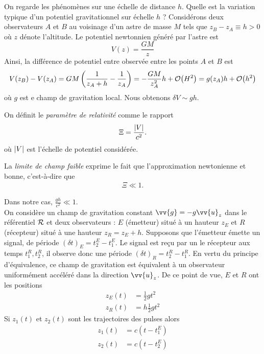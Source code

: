 \documentclass[a4paper,11pt]{report}
\begin{document}
                On regarde les phénomènes sur une échelle de distance $h$. Quelle est la variation typique d'un potentiel gravitationnel sur échelle $h$ ? Considérons deux observateurs $A$ et $B$ au voisinage d'un astre de masse $M$ tels que $z_B-z_A\equiv h>0$ où $z$ dénote l'altitude. Le potentiel newtonnien généré par l'astre est
                \begin{equation}
                    V(z) = \frac{GM}{z}
                \end{equation}
                Ainsi, la différence de potentiel entre observée entre les points $A$ et $B$ est
                \begin{equation}
                    V(z_B)-V(z_A) = GM\left( \frac{1}{z_A+h} -\frac{1}{z_A}\right)=-\frac{GM}{z^2_A}h+\order{H^2} = g(z_A)h +\order{h^2}
                \end{equation}
                où $g$ est e champ de gravitation local. Nous obtenons $\delta V\sim gh$.
                \begin{definition}
                    On définit le \textit{paramètre de relativité} comme le rapport
                    \begin{equation}
                        \Xi = \frac{\abs{V}}{c^2}.
                    \end{equation}
                    où $\abs{V}$ est l'échelle de potentiel considérée.
                \end{definition}
                \begin{definition}
                La \textit{limite de champ faible} exprime le fait que l'approximation newtonienne et bonne, c'est-à-dire que
                \begin{align}
                    \Xi\ll1.
                \end{align}
                \end{definition}
                Dans notre cas, $\frac{gh}{c^2}\ll1$.\\
            
                On considère un champ de gravitation constant $\vv{g}=-g\vv{u}_z$ dans le référentiel $\mathcal{R}$ et deux observateurs : $E$ (émetteur) situé à un hauteur $z_E$ et $R$ (récepteur) situé à une hauteur $z_R = z_E+h$. Supposons que l'émetteur émette un signal, de période $(\delta t)_E = t_2^E-t_1^E$. Le signal est reçu par un le récepteur aux temps $t_1^R,t_2^R$, il observe donc une période $(\delta t)_R = t_2^R-t_1^R$. En vertu du principe d'équivalence, ce champ de gravitation est équivalent à un observateur uniformément accéléré dans la direction $\vv{u}_z$. De ce point de vue, $E$ et $R$ ont les positions
                \begin{align}
                    z_E(t) &=  \frac{1}{2}gt^2 \\
                    z_R(t) &= h  \frac{1}{2}gt^2
                \end{align}
                Si $z_1(t)$ et $z_2(t)$ sont les trajectoires des pulses alors
                \begin{align}
                    z_1(t) &= c(t-t^E_1) \\
                    z_2(t) &= c(t-t_2^E)
                \end{align}
                
\end{document}
